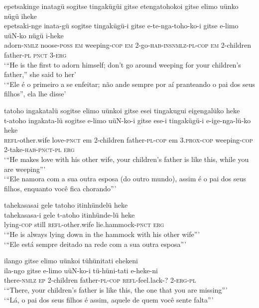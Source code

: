 \documentclass[output=paper,
modfonts,nonflat
]{langsci/langscibook}
\begin{document}
\ea epetsakinge inatagü sogitse tingakügüi gitse etengatohokoi gitse elimo uünko nügü iheke \\[.3em]
\gll epetsaki-nge	inata-gü	sogitse	tingakügü-i	gitse e-te-nga-toho-ko-i		gitse	e-limo	uüN-ko	nügü	i-heke \\
adorn-\textsc{nmlz}	noose-\textsc{poss} 	\textsc{em}	weeping-\textsc{cop}	\textsc{em} 2-go-\textsc{hab-insnmlz-pl-cop} 	\textsc{em}	2-children 	father-\textsc{pl} 	\textsc{pnct}	3-\textsc{erg} \\
\glt ‘“He is the first to adorn himself; don’t go around weeping for your children’s father,” she said to her’ \\
‘“Ele é o primeiro a se enfeitar; não ande sempre por aí pranteando o pai dos seus filhos”, ela lhe disse’ \\
\z

 
\ea tatoho ingakatalü sogitse elimo uünkoi gitse esei tingakugui eigengalüko heke \\[.3em]
\gll t-atoho	 ingakata-lü sogitse e-limo uüN-ko-i	gitse ese-i tingakügü-i e-ige-nga-lü-ko heke \\
\textsc{refl}-other.wife love-\textsc{pnct} em 2-children father-\textsc{pl-cop} em 3.\textsc{prox-cop} weeping-\textsc{cop} 2-take-\textsc{hab-pnct-pl} \textsc{erg} \\
\glt ‘“He makes love with his other wife, your children’s father is like this, while you are weeping”’\\
‘“Ele namora com a sua outra esposa (do outro mundo), assim é o pai dos seus filhos, enquanto você fica chorando”’ \\
\z


\ea tahekasasai gele tatoho itinhündelü heke \\[.3em]
\gll tahekasasa-i	gele	t-atoho		itinhünde-lü		heke \\
lying-\textsc{cop}	still	\textsc{refl}-other.wife	lie.hammock-\textsc{pnct}	\textsc{erg} \\
\glt ‘“He is always lying down in the hammock with his other wife”’ \\
‘“Ele está sempre deitado na rede com a sua outra esposa”’ \\
\z

\ea ilango gitse elimo uünkoi tühünitati ehekeni \\[.3em]
\gll ila-ngo		gitse	e-limo		uüN-ko-i	tü-hüni-tati	e-heke-ni \\
there-\textsc{nmlz}	\textsc{ep} 	2-children 	father-\textsc{pl-cop}	\textsc{refl}-feel.lack-? 	2-\textsc{erg-pl} \\
\glt ‘“There, your children’s father is like this, the one that you are missing”’ \\
‘“Lá, o pai dos seus filhos é assim, aquele de quem você sente falta”’ \\
\z
\end{document}
